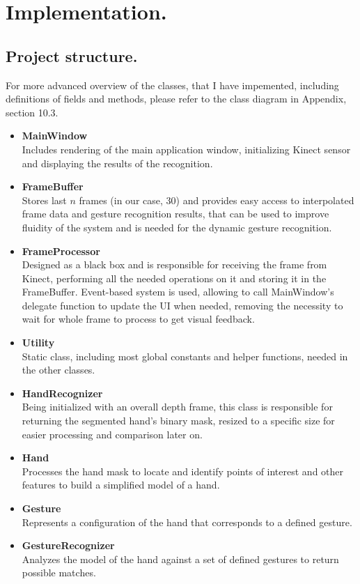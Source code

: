 \documentclass[a4paper,11pt,oneside]{article}
\begin{document}
 \section{Implementation.}

\subsection{Project structure.}

For more advanced overview of the classes, that I have impemented, including definitions of fields and methods, please refer to the class diagram in Appendix, section 10.3.\\

\begin{itemize}
\item \textbf{MainWindow}\\
Includes rendering of the main application window, initializing Kinect sensor and displaying the results of the recognition.

\item \textbf{FrameBuffer}\\
Stores last $n$ frames (in our case, 30) and provides easy access to interpolated frame data and gesture recognition results, that can be used to improve fluidity of the system and is needed for the dynamic gesture recognition.

\item \textbf{FrameProcessor}\\
Designed as a black box and is responsible for receiving the frame from Kinect, performing all the needed operations on it and storing it in the FrameBuffer. Event-based system is used, allowing to call MainWindow's delegate function to update the UI when needed, removing the necessity to wait for whole frame to process to get visual feedback.

\item \textbf{Utility}\\
Static class, including most global constants and helper functions, needed in the other classes.

\item \textbf{HandRecognizer}\\
Being initialized with an overall depth frame, this class is responsible for returning the segmented hand's binary mask, resized to a specific size for easier processing and comparison later on.

\item \textbf{Hand}\\
Processes the hand mask to locate and identify points of interest and other features to build a simplified model of a hand.

\item \textbf{Gesture}\\
Represents a configuration of the hand that corresponds to a defined gesture.

\item \textbf{GestureRecognizer}\\
Analyzes the model of the hand against a set of defined gestures to return possible matches.

\end{itemize}
\end{document}
